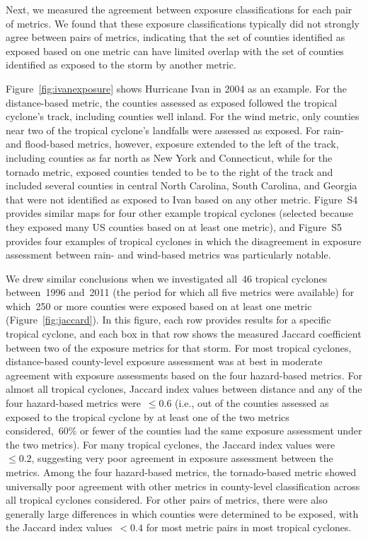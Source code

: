 Next, we measured the agreement between exposure classifications for each pair
of metrics. We found that these exposure classifications typically did not
strongly agree between pairs of metrics, indicating that the set of counties
identified as exposed based on one metric can have limited overlap with the
set of counties identified as exposed to the storm by another metric. 

Figure~\ref{fig:ivanexposure} shows Hurricane Ivan in 2004 as an example. For
the distance-based metric, the counties assessed as exposed followed the
tropical cyclone's track, including counties well inland. For the wind metric,
only counties near two of the tropical cyclone's landfalls were assessed as
exposed. For rain- and flood-based metrics, however, exposure extended to the
left of the track, including counties as far north as New York and Connecticut,
while for the tornado metric, exposed counties tended to be to the right of the
track and included several counties in central North Carolina, South Carolina,
and Georgia that were not identified as exposed to Ivan based on any other
metric. Figure~S4 provides similar maps for four other example tropical
cyclones (selected because they exposed many \ac{US}  counties based on at
least one metric), and Figure~S5 provides four examples of tropical cyclones in
which the disagreement in exposure assessment between rain- and wind-based
metrics was particularly notable.

We drew similar conclusions when we investigated all~46 tropical cyclones
between~1996 and~2011 (the period for which all five metrics were available)
for which~250 or more counties were exposed based on at least one metric
(Figure~\ref{fig:jaccard}). In this figure, each row provides results for a
specific tropical cyclone, and each box in that row shows the measured Jaccard
coefficient between two of the exposure metrics for that storm.  For most
tropical cyclones, distance-based county-level exposure assessment was at best
in moderate agreement with exposure assessments based on the four hazard-based
metrics. For almost all tropical cyclones, Jaccard index values between
distance and any of the four hazard-based metrics were~$\le0.6$ (i.e., out of
the counties assessed as exposed to the tropical cyclone by at least one of the
two metrics considered,~60\si{\percent} or fewer of the counties had the same
exposure assessment under the two metrics). For many tropical cyclones, the
Jaccard index values were~$\le0.2$, suggesting very poor agreement in exposure
assessment between the metrics.  Among the four hazard-based metrics, the
tornado-based metric showed universally poor agreement with other metrics in
county-level classification across all tropical cyclones considered.  For other
pairs of metrics, there were also generally large differences in which counties
were determined to be exposed, with the Jaccard index values~$<0.4$ for most
metric pairs in most tropical cyclones.


